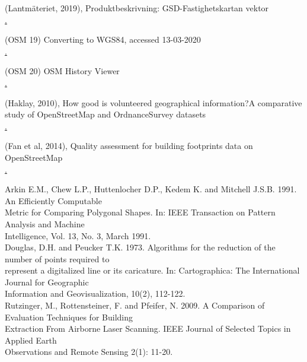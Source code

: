 \documentclass[a4paper]{article}
\begin{document}
\begin{thebibliography}{9}

(Lantmäteriet, 2019), Produktbeskrivning: GSD-Fastighetskartan vektor \\ 
\href{https://www.lantmateriet.se/globalassets/kartor-och-geografisk-information/kartor/fastshmi.pdf}.

(OSM 19) Converting to WGS84, accessed 13-03-2020 \\ 
\href{https://wiki.openstreetmap.org/wiki/Converting\_to\_WGS84}.

(OSM 20) OSM History Viewer\\
\href{https://wiki.openstreetmap.org/wiki/OSM\_History\_Viewer}.

(Haklay, 2010), How good is volunteered geographical information?A comparative study of OpenStreetMap and OrdnanceSurvey datasets \\
\href{https://kfrichter.org/crowdsourcing-material/day1/haklay10.pdf}.

(Fan et al, 2014), Quality assessment for building footprints data on OpenStreetMap \\
\href{https://www.researchgate.net/publication/262163378\_Quality\_assessment\_for\_building\_footprints\_data\_on\_OpenStreetMap}.

Arkin E.M., Chew L.P., Huttenlocher D.P., Kedem K. and Mitchell J.S.B. 1991. An Efficiently Computable \\
Metric for Comparing Polygonal Shapes. In: IEEE Transaction on Pattern Analysis and Machine \\
Intelligence, Vol. 13, No. 3, March 1991. \\

Douglas, D.H. and Peucker T.K. 1973. Algorithms for the reduction of the number of points required to \\
represent a digitalized line or its caricature. In: Cartographica: The International Journal for Geographic \\
Information and Geovisualization, 10(2), 112-122. \\

Rutzinger, M., Rottensteiner, F. and Pfeifer, N. 2009. A Comparison of Evaluation Techniques for Building \\
Extraction From Airborne Laser Scanning. IEEE Journal of Selected Topics in Applied Earth \\
Observations and Remote Sensing 2(1): 11-20. \\


\end{thebibliography}
\end{document}
